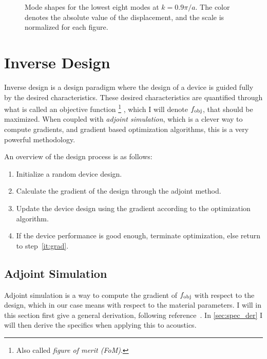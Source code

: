 \begin{figure}[htpb]
	\caption{%
		Mode shapes for the lowest eight modes at $k=0.9 \pi / a$.
		The color denotes the absolute value of the displacement,
		and the scale is normalized for each figure.
	}%
	\label{fig:modeshapes}
\end{figure}


\chapter{Inverse Design}

Inverse design is a design paradigm where the design of a device is guided fully by
the desired characteristics.
These desired characteristics are quantified through what is called an objective
function%
\footnote{Also called \emph{figure of merit (FoM)}.}%
, which I will denote $f_\text{obj}$,
that should be maximized.
When coupled with \emph{adjoint simulation}, which is a clever way to compute
gradients, and gradient based optimization
algorithms, this is a very powerful methodology.

An overview of the design process is as follows:
\begin{enumerate}
	\item Initialize a random device design.
	\item\label{it:grad} Calculate the gradient of the design through the adjoint method.
	\item Update the device design using the gradient according to the optimization algorithm.
	\item If the device performance is good enough, terminate optimization, else
		return to step~\ref{it:grad}.
\end{enumerate}

\section{Adjoint Simulation}

Adjoint simulation is a way to compute the gradient of $f_\text{obj}$ with respect to
the design, which in our case means with respect to the material parameters.
I will in this section first give a general derivation, following
reference~\cite{giles_introduction_2000}.
In \cref{sec:spec_der} I will then derive the specifics when applying this to
acoustics.

